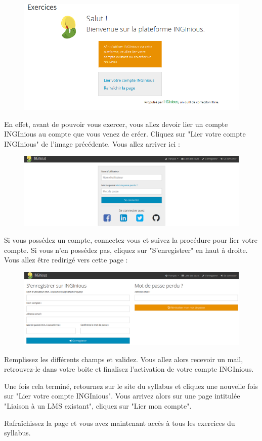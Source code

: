 \documentclass{article}
\begin{document}
\begin{figure}[!htb]
    \centering
    \includegraphics[scale=0.5]{images/Ingi.png}
\end{figure}

En effet, avant de pouvoir vous exercer, vous allez devoir lier un compte INGInious au compte que vous venez de créer.
Cliquez sur "Lier votre compte INGInious" de l'image précédente. Vous allez arriver ici :

\begin{figure}[!htb]
    \centering
    \includegraphics[scale=0.5]{images/inscription_INGI.png}
\end{figure}

Si vous possédez un compte, connectez-vous et suivez la procédure pour lier votre compte. Si vous n'en possédez pas, cliquez sur "S'enregistrer" en haut à droite. Vous allez être redirigé vers cette page :

\begin{figure}[!htb]
    \centering
    \includegraphics[scale=0.5]{images/enregistrement_INGI.png}
\end{figure}

Remplissez les différents champs et validez. Vous allez alors recevoir un mail, retrouvez-le dans votre boite et finalisez l'activation de votre compte INGInious. 

\bigskip
Une fois cela terminé, retournez sur le site du syllabus et cliquez une nouvelle fois sur "Lier votre compte INGInious". Vous arrivez alors sur une page intitulée "Liaison à un LMS existant", cliquez sur "Lier mon compte". 

\bigskip

Rafraîchissez la page et vous avez maintenant accès à tous les exercices du syllabus.
\end{document}
